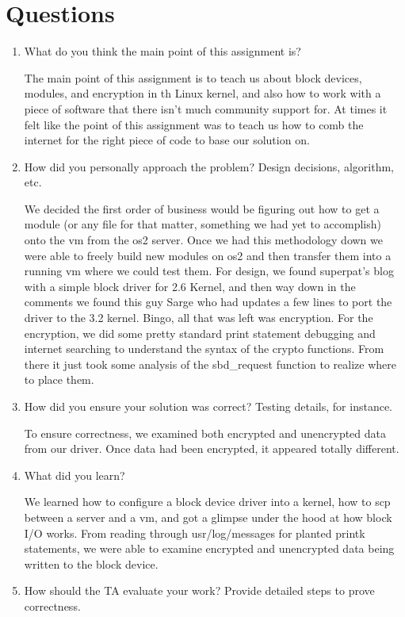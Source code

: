 \documentclass[letterpaper,10pt,fleqn]{article}
\begin{document}
\section*{Questions}
\begin{enumerate}
\item What do you think the main point of this assignment is?

The main point of this assignment is to teach us about block devices, modules, and encryption in th Linux kernel, and also how to work with a piece of software that there isn't much community support for. At times it felt like the point of this assignment was to teach us how to comb the internet for the right piece of code to base our solution on. 

\item How did you personally approach the problem? Design decisions, algorithm, etc. 

We decided the first order of business would be figuring out how to get a module (or any file for that matter, something we had yet to accomplish) onto the vm from the os2 server. Once we had this methodology down we were able to freely build new modules on os2 and then transfer them into a running vm where we could test them. For design, we found superpat's blog with a simple block driver for 2.6 Kernel, and then way down in the comments we found this guy Sarge who had updates a few lines to port the driver to the 3.2 kernel. Bingo, all that was left was encryption. For the encryption, we did some pretty standard print statement debugging and internet searching to understand the syntax of the crypto functions. From there it just took some analysis of the sbd_request function to realize where to place them.


\item How did you ensure your solution was correct? Testing details, for instance. 

To ensure correctness, we examined both encrypted and unencrypted data from our driver. Once data had been encrypted, it appeared totally different.


\item What did you learn? 

We learned how to configure a block device driver into a kernel, how to scp between a server and a vm, and got a glimpse under the hood at how block I/O works. From reading through usr/log/messages for planted printk statements, we were able to examine encrypted and unencrypted data being written to the block device. 

\item How should the TA evaluate your work? Provide detailed steps to prove correctness.



\end{enumerate}
\end{document}
